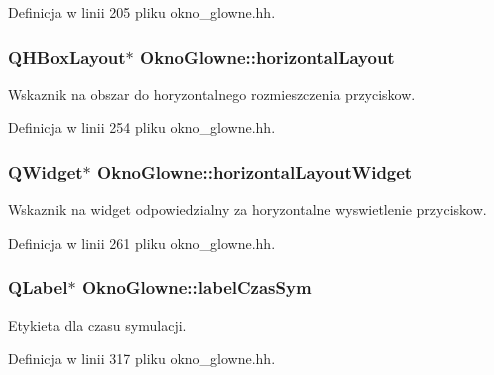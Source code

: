 Definicja w linii 205 pliku okno\-\_\-glowne.\-hh.

\hypertarget{class_okno_glowne_aacb5ddb6d0eb560a47917cc1b457239a}{
\subsubsection[{horizontal\-Layout}]{\setlength{\rightskip}{0pt plus 5cm}Q\-H\-Box\-Layout$\ast$ Okno\-Glowne\-::horizontal\-Layout\hspace{0.3cm}{\ttfamily [private]}}}\label{class_okno_glowne_aacb5ddb6d0eb560a47917cc1b457239a}
Wskaznik na obszar do horyzontalnego rozmieszczenia przyciskow. 

Definicja w linii 254 pliku okno\-\_\-glowne.\-hh.

\hypertarget{class_okno_glowne_a12ac2d00b9ca186176ccc710a928a723}{
\subsubsection[{horizontal\-Layout\-Widget}]{\setlength{\rightskip}{0pt plus 5cm}Q\-Widget$\ast$ Okno\-Glowne\-::horizontal\-Layout\-Widget\hspace{0.3cm}{\ttfamily [private]}}}\label{class_okno_glowne_a12ac2d00b9ca186176ccc710a928a723}
Wskaznik na widget odpowiedzialny za horyzontalne wyswietlenie przyciskow. 

Definicja w linii 261 pliku okno\-\_\-glowne.\-hh.

\hypertarget{class_okno_glowne_aca07e1dc5cbe30d6952f9b952073bb79}{
\subsubsection[{label\-Czas\-Sym}]{\setlength{\rightskip}{0pt plus 5cm}Q\-Label$\ast$ Okno\-Glowne\-::label\-Czas\-Sym\hspace{0.3cm}{\ttfamily [private]}}}\label{class_okno_glowne_aca07e1dc5cbe30d6952f9b952073bb79}
Etykieta dla czasu symulacji. 

Definicja w linii 317 pliku okno\-\_\-glowne.\-hh.

